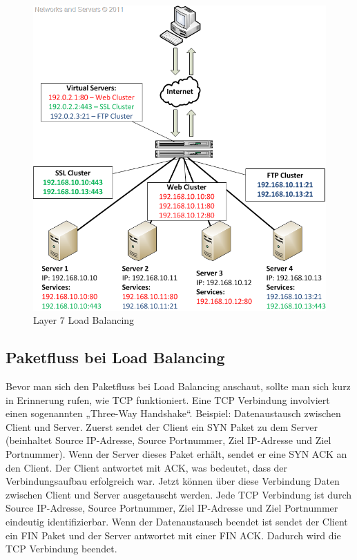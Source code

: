 \begin{figure}[!h]
	\begin{center}
		\includegraphics[width=0.55\linewidth]{images/loadbalancing7.jpg}
		\caption{Layer 7 Load Balancing \cite{LoadBalancing2}}
		\label{Layer 7 Load Balancing_2}
	\end{center}
\end{figure}

\pagebreak
\subsection{Paketfluss bei Load Balancing}
\label{sec:Paketfluss bei Load Balancing}

Bevor man sich den Paketfluss bei Load Balancing anschaut, sollte man sich kurz in Erinnerung rufen, wie TCP funktioniert. Eine TCP Verbindung involviert einen sogenannten „Three-Way Handshake“. Beispiel: Datenaustausch zwischen Client und Server. Zuerst sendet der Client ein SYN Paket zu dem Server (beinhaltet Source IP-Adresse, Source Portnummer, Ziel IP-Adresse und Ziel Portnummer). Wenn der Server dieses Paket erhält, sendet er eine SYN ACK an den Client. Der Client antwortet mit ACK, was bedeutet, dass der Verbindungsaufbau erfolgreich war. Jetzt können über diese Verbindung Daten zwischen Client und  Server ausgetauscht werden. Jede TCP Verbindung ist durch Source IP-Adresse, Source Portnummer, Ziel IP-Adresse und Ziel Portnummer eindeutig identifizierbar. Wenn der Datenaustausch beendet ist sendet der Client ein FIN Paket und der Server antwortet mit einer FIN ACK. Dadurch wird die TCP Verbindung beendet. \cite{LoadBalancing2}

